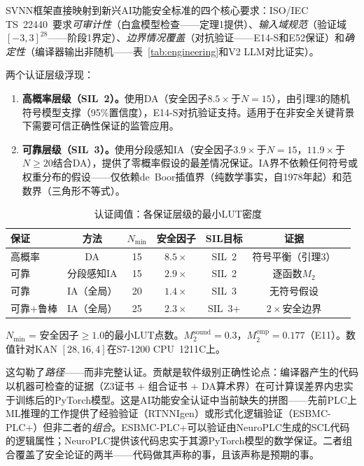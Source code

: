 \documentclass[journal,onecolumn]{IEEEtran}
\theoremstyle{definition}
\theoremstyle{plain}
\theoremstyle{remark}
\begin{document}
SVNN框架直接映射到新兴AI功能安全标准的四个核心要求：ISO/IEC TS~22440~\cite{iso22440}要求\textit{可审计性}（白盒模型检查——定理1提供）、\textit{输入域规范}（验证域$[-3,3]^{28}$——阶段1界定）、\textit{边界情况覆盖}（对抗验证——E14-S和E52保证）和\textit{确定性}（编译器输出非随机——表~\ref{tab:engineering}和V2 LLM对比证实）。

两个认证层级浮现：

\begin{enumerate}
    \item \textbf{高概率层级（SIL~2）。}使用DA（安全因子$8.5\times$于$N=15$），由引理3的随机符号模型支撑（95\%置信度），E14-S对抗验证支持。适用于在非安全关键背景下需要可信正确性保证的监管应用。
    \item \textbf{可靠层级（SIL~3）。}使用分段感知IA（安全因子$3.9\times$于$N=15$，$11.9\times$于$N\geq 20$结合DA），提供了零概率假设的最差情况保证。IA界不依赖任何符号或权重分布的假设——仅依赖de~Boor插值界（纯数学事实，自1978年起）和范数界（三角形不等式）。
\end{enumerate}

\begin{table}[!t]
\centering
\caption{认证阈值：各保证层级的最小LUT密度}
\label{tab:cert_thresholds}
\small
\begin{tabular}{@{}lcccccc@{}}
\toprule
\textbf{保证} & \textbf{方法} & \textbf{$N_{\min}$} & \textbf{安全因子} & \textbf{SIL目标} & \textbf{证据} \\
\midrule
高概率  & DA & 15 & $8.5\times$ & SIL~2 & 符号平衡（引理3） \\
可靠    & 分段感知IA & 15 & $2.9\times$ & SIL~2 & 逐函数$M_2$ \\
可靠    & IA（全局）& 20 & $1.4\times$ & SIL~3 & 无符号假设 \\
可靠+鲁棒 & IA（全局）& 25 & $2.3\times$ & SIL~3+ & $2\times$安全边界 \\
\bottomrule
\end{tabular}
\vspace{2pt}
{\scriptsize $N_{\min}$ = 安全因子$\geq 1.0$的最小LUT点数。$M_2^{\text{sound}} = 0.3$，$M_2^{\text{emp}} = 0.177$（E11）。数值针对KAN $[28,16,4]$在S7-1200 CPU~1211C上。}
\end{table}

这勾勒了\textit{路径}——而非完整认证。贡献是软件级别正确性论点：编译器产生的代码以机器可检查的证据（Z3证书 + 组合证书 + DA算术界）在可计算误差界内忠实于训练后的PyTorch模型。这是AI功能安全认证中当前缺失的拼图——先前PLC上ML推理的工作提供了经验验证（RTNNIgen）或形式化逻辑验证（ESBMC-PLC+）但非二者的\textit{组合}。ESBMC-PLC+可以验证由NeuroPLC生成的SCL代码的逻辑属性；NeuroPLC提供该代码忠实于其源PyTorch模型的数学保证。二者组合覆盖了安全论证的两半——代码做其声称的事，且该声称是预期的事。
\end{document}
